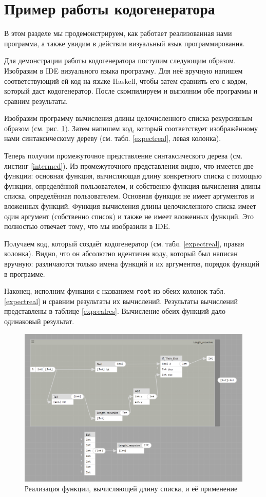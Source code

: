 \section{Пример работы кодогенератора}
В этом разделе мы продемонстрируем, как работает реализованная нами программа, а также увидим в действии визуальный язык программирования.

Для демонстрации работы кодогенератора поступим следующим образом. Изобразим в IDE визуального языка программу. Для неё вручную напишем соответствующий ей код на языке Haskell, чтобы затем сравнить его с кодом, который даст кодогенератор. После скомпилируем и выполним обе программы и сравним результаты.

Изобразим программу вычисления длины целочисленного списка рекурсивным образом (см. рис. \ref{lengthrec}). Затем напишем код, который соответствует изображённому нами синтаксическому дереву (см. табл. \ref{expectreal}, левая колонка). 

Теперь получим промежуточное представление синтаксического дерева (см. листинг \ref{intermed}). Из промежуточного представления видно, что имеется две функции: основная функция, вычисляющая длину конкретного списка с помощью функции, определённой пользователем, и собственно функция вычисления длины списка, определённая пользователем. Основная функция не имеет аргументов и вложенных функций. Функция вычисления длины целочисленного списка имеет один аргумент (собственно список) и также не имеет вложенных функций. Это полностью отвечает тому, что мы изобразили в IDE.

Получаем код, который создаёт кодогенератор (см. табл. \ref{expectreal}, правая колонка). Видно, что он абсолютно идентичен коду, который был написан вручную: различаются только имена функций и их аргументов, порядок функций в программе.

Наконец, исполним функции с названием \lstinline!root! из обеих колонок табл. \ref{expectreal} и сравним результаты их вычислений. Результаты вычислений представлены в таблице \ref{exprealres}. Вычисление обеих функций дало одинаковый результат.

\begin{figure}[p]
\centering
\includegraphics[width=\textwidth]{img/length.PNG}
\caption{Реализация функции, вычисляющей длину списка, и её применение} \label{lengthrec}	
\end{figure}

